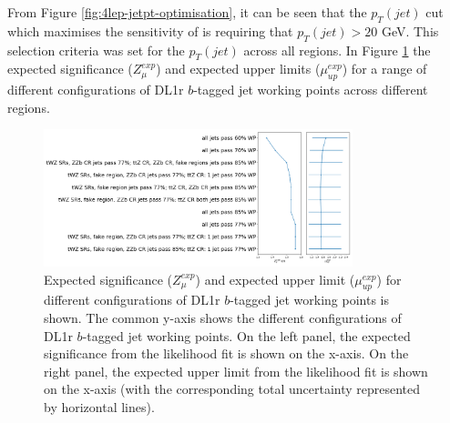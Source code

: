 From Figure \ref{fig:4lep-jetpt-optimisation}, it can be seen that the $p_{T}(jet)$ cut which maximises the sensitivity of \tWZ is requiring that $p_{T}(jet) > 20$ GeV. This selection criteria was set for the $p_{T}(jet)$ across all regions. In Figure \ref{fig:4lep-btagWP-optimization} the expected significance ($Z_{\mu}^{exp}$) and expected upper limits ($\mu_{up}^{exp}$) for a range of different configurations of DL1r $b$-tagged jet working points across different regions.
\begin{figure}[h!]
	\includegraphics[width = 0.8\textwidth]{figures/btagWP_optimization.png}
  \centering
	\caption{Expected significance ($Z_{\mu}^{exp}$) and expected upper limit ($\mu_{up}^{exp}$) for different configurations of DL1r $b$-tagged jet working points is shown. The common y-axis shows the different configurations of DL1r $b$-tagged jet working points. On the left panel, the expected significance from the likelihood fit is shown on the x-axis. On the right panel, the expected upper limit from the likelihood fit is shown on the x-axis (with the corresponding total uncertainty represented by horizontal lines).}
	\label{fig:4lep-btagWP-optimization}
\end{figure}

